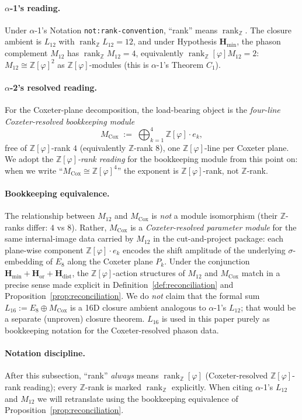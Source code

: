 \documentclass[11pt, a4paper]{amsart}
\theoremstyle{definition}
\newcommand{\Z}{\mathbb{Z}}
\newcommand{\rk}{\operatorname{rank}}
\newcommand{\Hmin}{\mathbf{H}_{\min}}
\newcommand{\Hor}{\mathbf{H}_{\mathrm{or}}}
\newcommand{\Hdist}{\mathbf{H}_{\mathrm{dist}}}
\newcommand{\Ophi}{\mathbb{Z}[\varphi]}
\newcommand{\Mcox}{M_{\mathrm{Cox}}}
\newcommand{\Mtw}{M_{12}}
\begin{document}
\paragraph{$\alpha$-1's reading.} Under $\alpha$-1's
Notation \texttt{not:rank-convention}, ``rank'' means $\rk_\Z$.
The closure ambient is $L_{12}$ with $\rk_\Z L_{12} = 12$, and
under Hypothesis $\Hmin$, the phason complement $\Mtw$ has
$\rk_\Z \Mtw = 4$, equivalently $\rk_\Ophi \Mtw = 2$:
$\Mtw \cong \Ophi^{2}$ as $\Ophi$-modules (this is $\alpha$-1's
Theorem $C_1$).

\paragraph{$\alpha$-2's resolved reading.} For the
Coxeter-plane decomposition, the load-bearing object is the
\emph{four-line Coxeter-resolved bookkeeping module}
\[
  \Mcox \;:=\; \bigoplus_{k=1}^{4} \Ophi \cdot e_k,
\]
free of $\Ophi$-rank $4$ (equivalently $\Z$-rank $8$), one
$\Ophi$-line per Coxeter plane. We adopt the
\emph{$\Ophi$-rank reading} for the bookkeeping module from
this point on: when we write ``$\Mcox \cong \Ophi^{4}$'' the
exponent is $\Ophi$-rank, not $\Z$-rank.

\paragraph{Bookkeeping equivalence.} The relationship between
$\Mtw$ and $\Mcox$ is \emph{not} a module isomorphism (their
$\Z$-ranks differ: $4$ vs $8$). Rather, $\Mcox$ is a
\emph{Coxeter-resolved parameter module} for the same
internal-image data carried by $\Mtw$ in the cut-and-project
package: each plane-wise component $\Ophi \cdot e_k$ encodes
the shift amplitude of the underlying $\sigma$-embedding of
$E_8$ along the Coxeter plane $P_k$. Under the conjunction
$\Hmin + \Hor + \Hdist$, the $\Ophi$-action structures of
$\Mtw$ and $\Mcox$ match in a precise sense made explicit in
Definition~\ref{def:reconciliation} and
Proposition~\ref{prop:reconciliation}. We do \emph{not} claim
that the formal sum $L_{16} := E_8 \oplus \Mcox$ is a 16D
closure ambient analogous to $\alpha$-1's $L_{12}$; that
would be a separate (unproven) closure theorem. $L_{16}$ is
used in this paper purely as bookkeeping notation for the
Coxeter-resolved phason data.

\paragraph{Notation discipline.} After this subsection,
``rank'' \emph{always} means $\rk_\Ophi$ (Coxeter-resolved
$\Ophi$-rank reading); every $\Z$-rank is marked
$\rk_\Z$ explicitly. When citing $\alpha$-1's $L_{12}$ and
$\Mtw$ we will retranslate using the bookkeeping equivalence
of Proposition~\ref{prop:reconciliation}.
\end{document}
